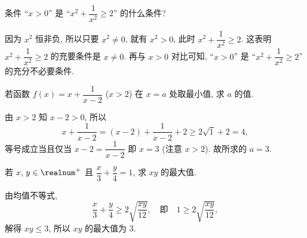 \begin{example}
    条件 ``$x>0$'' 是 ``$x^2+\dfrac1{x^2}\geqslant 2$'' 的什么条件?
\end{example}
\begin{solution}
    因为 $x^2$ 恒非负, 所以只要 $x^2\neq0$, 就有 $x^2>0$, 此时 $x^2+\dfrac1{x^2}\geqslant 2$. 这表明 $x^2+\dfrac1{x^2}\geqslant 2$ 的充要条件是 $x\neq 0$. 再与 $x>0$ 对比可知, ``$x>0$'' 是 ``$x^2+\dfrac1{x^2}\geqslant 2$'' 的充分不必要条件.
\end{solution}

\begin{example}
    若函数 $f(x)= x+\dfrac1{x-2}$ ($x>2$) 在 $x=a$ 处取最小值, 求 $a$ 的值.
\end{example}
\begin{solution}
    由 $x>2$ 知 $x-2>0$, 所以
    \[x+\dfrac1{x-2}= (x-2)+\dfrac1{x-2}+2\geqslant 2\sqrt1+2=4,\]
    等号成立当且仅当 $x-2=\dfrac1{x-2}$ 即 $x=3$ (注意 $x>2$). 故所求的 $a=3$.
\end{solution}

\begin{example}
    若 $x$, $y\in\realnum^+$ 且 $\dfrac{x}3+\dfrac{y}4=1$, 求 $xy$ 的最大值.
\end{example}
\begin{solution}
    由均值不等式, 
    \[\frac{x}3+\frac{y}4\geqslant 2\sqrt{\frac{xy}{12}},
    \quad\text{即}\quad 1\geqslant 2\sqrt{\frac{xy}{12}},\]
    解得 $xy\leqslant 3$, 所以 $xy$ 的最大值为 $3$.
\end{solution}